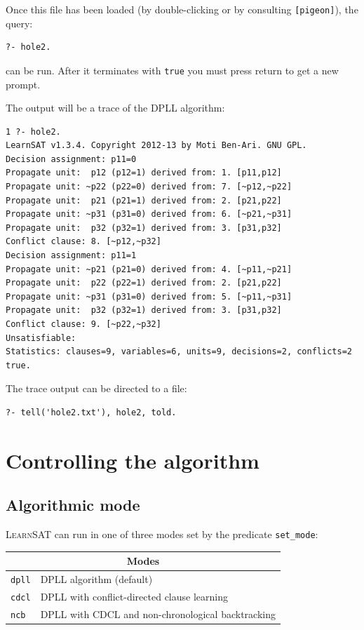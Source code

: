 \documentclass[11pt]{article}
\newcommand*{\p}[1]{\textup{\texttt{#1}}}
\newcommand*{\ls}{\textsc{LearnSAT}}
\begin{document}
Once this file has been loaded (by double-clicking or by consulting
\p{[pigeon]}), the query:
\begin{verbatim}
?- hole2. 
\end{verbatim}
can be run. After it terminates with \p{true} you must press
return to get a new prompt.

\newpage

The output will be a trace of the DPLL algorithm:

\begin{verbatim}
1 ?- hole2.
LearnSAT v1.3.4. Copyright 2012-13 by Moti Ben-Ari. GNU GPL.
Decision assignment: p11=0
Propagate unit:  p12 (p12=1) derived from: 1. [p11,p12]
Propagate unit: ~p22 (p22=0) derived from: 7. [~p12,~p22]
Propagate unit:  p21 (p21=1) derived from: 2. [p21,p22]
Propagate unit: ~p31 (p31=0) derived from: 6. [~p21,~p31]
Propagate unit:  p32 (p32=1) derived from: 3. [p31,p32]
Conflict clause: 8. [~p12,~p32]
Decision assignment: p11=1
Propagate unit: ~p21 (p21=0) derived from: 4. [~p11,~p21]
Propagate unit:  p22 (p22=1) derived from: 2. [p21,p22]
Propagate unit: ~p31 (p31=0) derived from: 5. [~p11,~p31]
Propagate unit:  p32 (p32=1) derived from: 3. [p31,p32]
Conflict clause: 9. [~p22,~p32]
Unsatisfiable:
Statistics: clauses=9, variables=6, units=9, decisions=2, conflicts=2
true.
\end{verbatim}

The trace output can be directed to a file:

\begin{verbatim}
?- tell('hole2.txt'), hole2, told.
\end{verbatim}

\newpage

\section{Controlling the algorithm}

\subsection{Algorithmic mode}

\ls{} can run in one of three modes set by the predicate \p{set\_mode}:

\begin{center}
\begin{tabular}{|l|l|}
\hline
\multicolumn{2}{|c|}{\textbf{\large Modes}}\\
\hline
\p{dpll} & DPLL algorithm (default)\\
\p{cdcl} & DPLL with conflict-directed clause learning\\
\p{ncb} &  DPLL with CDCL and non-chronological backtracking\\
\hline
\end{tabular}
\end{center}
\end{document}
